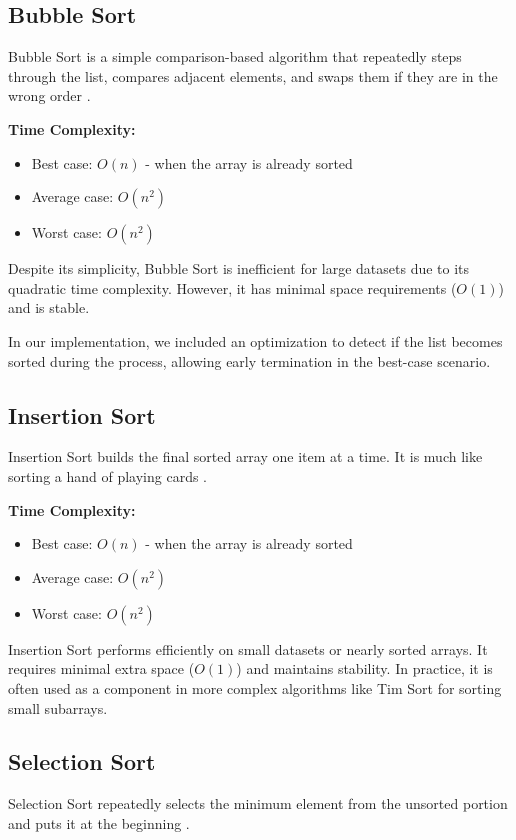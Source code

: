 \documentclass[sigconf]{acmart}
\begin{document}
\subsection{Bubble Sort}
Bubble Sort is a simple comparison-based algorithm that repeatedly steps through the list, compares adjacent elements, and swaps them if they are in the wrong order \cite{friend1956sorting}.

\textbf{Time Complexity:}
\begin{itemize}
    \item Best case: $O(n)$ - when the array is already sorted
    \item Average case: $O(n^2)$
    \item Worst case: $O(n^2)$
\end{itemize}

Despite its simplicity, Bubble Sort is inefficient for large datasets due to its quadratic time complexity. However, it has minimal space requirements ($O(1)$) and is stable.

In our implementation, we included an optimization to detect if the list becomes sorted during the process, allowing early termination in the best-case scenario.

\subsection{Insertion Sort}
Insertion Sort builds the final sorted array one item at a time. It is much like sorting a hand of playing cards \cite{knuth1998art}.

\textbf{Time Complexity:}
\begin{itemize}
    \item Best case: $O(n)$ - when the array is already sorted
    \item Average case: $O(n^2)$
    \item Worst case: $O(n^2)$
\end{itemize}

Insertion Sort performs efficiently on small datasets or nearly sorted arrays. It requires minimal extra space ($O(1)$) and maintains stability. In practice, it is often used as a component in more complex algorithms like Tim Sort for sorting small subarrays.

\subsection{Selection Sort}
Selection Sort repeatedly selects the minimum element from the unsorted portion and puts it at the beginning \cite{knuth1998art}.
\end{document}
